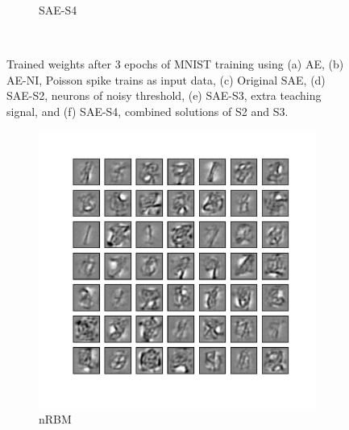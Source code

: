 \begin{figure}
\begin{subfigure}[t]{0.4\textwidth}
		\caption{SAE-S4}
	\end{subfigure}\\
	\caption{Trained weights after 3 epochs of MNIST training using (a) AE, (b) AE-NI, Poisson spike trains as input data, (c) Original SAE, (d) SAE-S2, neurons of noisy threshold, (e) SAE-S3, extra teaching signal, and (f) SAE-S4, combined solutions of S2 and S3.}
	\label{fig:weights_ae}
\end{figure}

\begin{figure}
	\centering
	\begin{subfigure}[t]{0.4\textwidth}
		\includegraphics[width=\textwidth]{pics_sdlm/32_MNIST_RBM/2_60000_0.pdf}
		\caption{nRBM}
	\end{subfigure}
	\begin{subfigure}[t]{0.4\textwidth}

\end{subfigure}
\end{figure}
